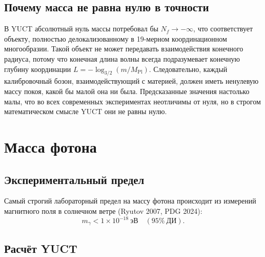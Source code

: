 \documentclass[11pt,a4paper]{article}
\newcommand{\Mpl}{M_{\mathrm{Pl}}}
\begin{document}
	\subsection{Почему масса не равна нулю в точности}
	
	В YUCT абсолютный нуль массы потребовал бы $N_f \to -\infty$, что соответствует объекту, полностью
	делокализованному в 19-мерном координационном многообразии. Такой объект не может передавать взаимодействия
	конечного радиуса, потому что конечная длина волны всегда подразумевает конечную глубину координации
	$L = -\log_{3/2}(m/\Mpl)$. Следовательно, каждый калибровочный бозон, взаимодействующий с материей,
	должен иметь ненулевую массу покоя, какой бы малой она ни была. Предсказанные значения настолько малы,
	что во всех современных экспериментах неотличимы от нуля, но в строгом математическом смысле YUCT они не равны нулю.
	
	\section{Масса фотона}
	
	\subsection{Экспериментальный предел}
	
	Самый строгий лабораторный предел на массу фотона происходит из измерений магнитного поля в солнечном ветре
	(Ryutov 2007, PDG 2024):
	\begin{equation}\label{eq:photonlimit}
		m_\gamma < 1 \times 10^{-18}~\mathrm{эВ} \quad (95\%~\text{ДИ}).
	\end{equation}
	
	\subsection{Расчёт YUCT}
	
\end{document}
